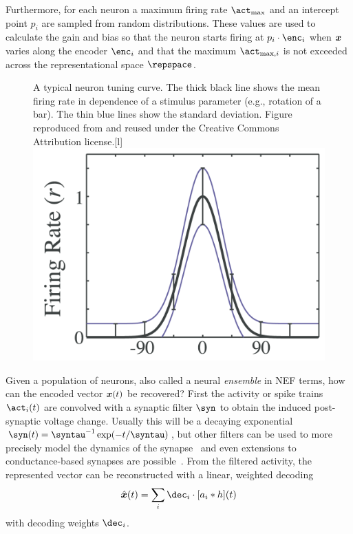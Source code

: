 Furthermore, for each neuron a maximum firing rate $\act_{\max}$ and an intercept point $p_i$ are sampled from random distributions.
These values are used to calculate the gain and bias so that the neuron starts firing at $p_i \cdot \enc_i$ when $\bm{x}$ varies along the encoder $\enc_i$ and that the maximum $\act_{\max,i}$ is not exceeded across the representational space $\repspace$.
\begin{figure}
    \begin{captionbeside}{A typical neuron tuning curve. The thick black line shows the mean firing rate in dependence of a stimulus parameter (e.g., rotation of a bar). The thin blue lines show the standard deviation. Figure reproduced from \textcite{butts2006} and reused under the Creative Commons Attribution license.}[l]
        \includegraphics{figures/tuningcurve}
    \end{captionbeside}\label{fig:tuningcurve}
\end{figure}

Given a population of neurons, also called a neural \emph{ensemble} in NEF terms, how can the encoded vector $\bm{x}(t)$ be recovered?
First the activity or spike trains $\act_i(t)$ are convolved with a synaptic filter $\syn$ to obtain the induced post-synaptic voltage change.
Usually this will be a decaying exponential $\syn(t) = \syntau^{-1}\exp(-t / \syntau)$, but other filters can be used to more precisely model the dynamics of the synapse~\parencite{voelker2017a} and even extensions to conductance-based synapses are possible~\parencite{stockel2017}.
From the filtered activity, the represented vector can be reconstructed with a linear, weighted decoding
\begin{equation}
    \hat{\vc x}(t) = \sum_i \dec_i \cdot \sbr{a_i * h}\!(t)
\end{equation}
with decoding weights $\dec_i$.

